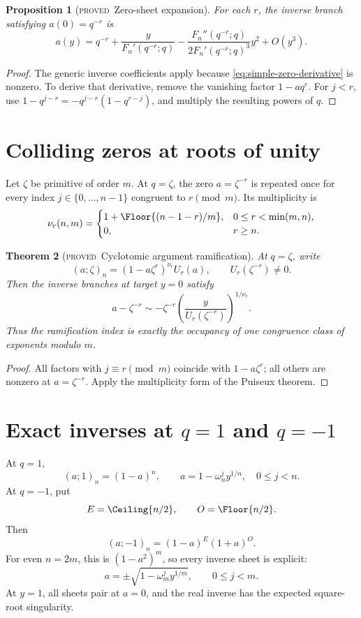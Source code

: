 \documentclass[11pt,letterpaper,oneside,openany]{book}
\newtheorem{theorem}{Theorem}[chapter]
\newtheorem{proposition}[theorem]{Proposition}
\theoremstyle{definition}
\theoremstyle{remark}
\newcommand{\statusproved}{\textcolor{provedgreen}{\textsc{proved}}}
\begin{document}
\begin{proposition}[\statusproved\ Zero-sheet expansion]
For each \(r\), the inverse branch satisfying \(a(0)=q^{-r}\) is
\[
 a(y)=q^{-r}+\frac{y}{F_n'(q^{-r};q)}
 -\frac{F_n''(q^{-r};q)}{2F_n'(q^{-r};q)^3}y^2+O(y^3).
\]
\end{proposition}
\begin{proof}
The generic inverse coefficients apply because
\eqref{eq:simple-zero-derivative} is nonzero.  To derive that derivative,
remove the vanishing factor \(1-aq^r\).  For \(j<r\), use
\(1-q^{j-r}=-q^{j-r}(1-q^{r-j})\), and multiply the resulting powers of
\(q\).
\end{proof}

\section{Colliding zeros at roots of unity}
Let \(\zeta\) be primitive of order \(m\).  At \(q=\zeta\), the zero
\(a=\zeta^{-r}\) is repeated once for every index \(j\in\{0,\ldots,n-1\}\)
congruent to \(r\pmod m\).  Its multiplicity is
\[
 \nu_r(n,m)=
 \begin{cases}
 1+\Floor{(n-1-r)/m},&0\le r<\min(m,n),\\
 0,&r\ge n.
 \end{cases}
\]

\begin{theorem}[\statusproved\ Cyclotomic argument ramification]
At \(q=\zeta\), write
\[
 (a;\zeta)_n=(1-a\zeta^r)^{\nu_r}U_r(a),
 \qquad U_r(\zeta^{-r})\ne0.
\]
Then the inverse branches at target \(y=0\) satisfy
\[
 a-\zeta^{-r}
 \sim-\zeta^{-r}
 \left(\frac{y}{U_r(\zeta^{-r})}\right)^{1/\nu_r}.
\]
Thus the ramification index is exactly the occupancy of one congruence class
of exponents modulo \(m\).
\end{theorem}
\begin{proof}
All factors with \(j\equiv r\pmod m\) coincide with
\(1-a\zeta^r\); all others are nonzero at \(a=\zeta^{-r}\).  Apply the
multiplicity form of the Puiseux theorem.
\end{proof}

\section{Exact inverses at \texorpdfstring{\(q=1\)}{q=1} and
\texorpdfstring{\(q=-1\)}{q=-1}}
At \(q=1\),
\[
 (a;1)_n=(1-a)^n,
 \qquad
 a=1-\omega_n^j y^{1/n},\quad 0\le j<n.
\]
At \(q=-1\), put
\[
 E=\Ceiling{n/2},\qquad O=\Floor{n/2}.
\]
Then
\begin{equation}\label{eq:qminus1-argument}
 (a;-1)_n=(1-a)^E(1+a)^O.
\end{equation}
For even \(n=2m\), this is \((1-a^2)^m\), so every inverse sheet is explicit:
\[
 a=\pm\sqrt{1-\omega_m^j y^{1/m}},
 \qquad 0\le j<m.
\]
At \(y=1\), all sheets pair at \(a=0\), and the real inverse has the expected
square-root singularity.
\end{document}
